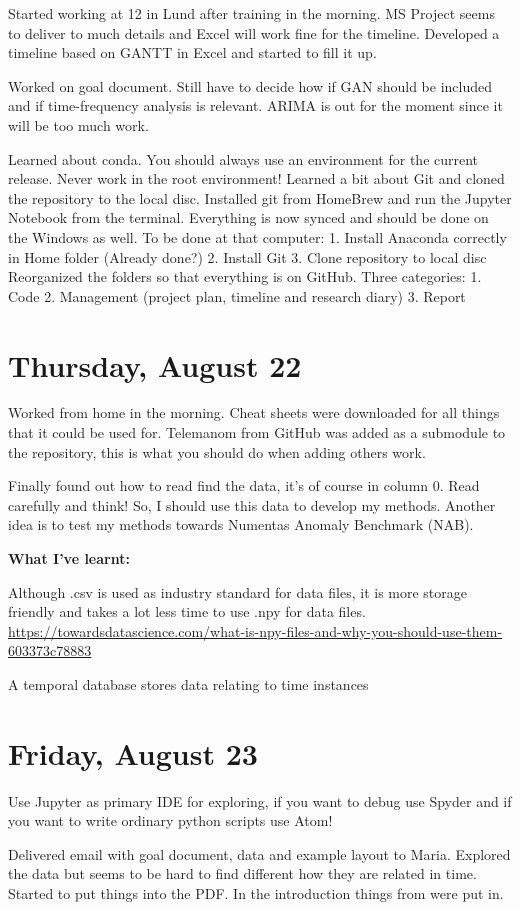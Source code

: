 \documentclass[11pt,letterpaper]{article}
\begin{document}
Started working at 12 in Lund after training in the morning. MS Project seems to deliver to much details and Excel will work fine for the timeline. Developed a timeline based on GANTT in Excel and started to fill it up.

Worked on goal document. Still have to decide how if GAN should be included and if time-frequency analysis is relevant. ARIMA is out for the moment since it will be too much work.

Learned about conda. You should always use an environment for the current release. Never work in the root environment! Learned a bit about Git and cloned the repository to the local disc. Installed git from HomeBrew and run the Jupyter Notebook from the terminal. Everything is now synced and should be done on the Windows as well. To be done at that computer:
1. Install Anaconda correctly in Home folder (Already done?)
2. Install Git
3. Clone repository to local disc
Reorganized the folders so that everything is on GitHub. Three categories:
1. Code
2. Management (project plan, timeline and research diary)
3. Report



\section*{Thursday, August 22}

Worked from home in the morning. Cheat sheets were downloaded for all things that it could be used for. Telemanom from GitHub was added as a submodule to the repository, this is what you should do when adding others work.

Finally found out how to read find the data, it's of course in column 0. Read carefully and think! So, I should use this data to develop my methods. Another idea is to test my methods towards Numentas Anomaly Benchmark (NAB).

\textbf{What I've learnt:}

Although .csv is used as industry standard for data files, it is more storage friendly and takes a lot less time to use .npy for data files. \newline
\url{https://towardsdatascience.com/what-is-npy-files-and-why-you-should-use-them-603373c78883}

A temporal database stores data relating to time instances

\section*{Friday, August 23}
Use Jupyter as primary IDE for exploring, if you want to debug use Spyder and if you want to write ordinary python scripts use Atom!

Delivered email with goal document, data and example layout to Maria. Explored the data but seems to be hard to find different how they are related in time. Started to put things into the PDF.
In the introduction things from \cite{Aggarwal2013a} were put in.

\printbibliography
\end{document}
